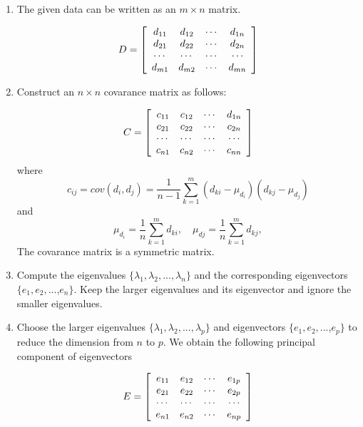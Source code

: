 \documentclass[12pt]{article}%
\begin{document}

\begin{enumerate}
\item The given data can be written as an $m\times n$ matrix.%

\[
D=\left[
\begin{array}
[c]{cccc}%
d_{11} & d_{12} & \cdots & d_{1n}\\
d_{21} & d_{22} & \cdots & d_{2n}\\
\cdots & \cdots & \cdots & \cdots\\
d_{m1} & d_{m2} & \cdots & d_{mn}%
\end{array}
\right]
\]


\item Construct an $n\times n$ covarance matrix as follows:%

\[
C=\left[
\begin{array}
[c]{cccc}%
c_{11} & c_{12} & \cdots & d_{1n}\\
c_{21} & c_{22} & \cdots & c_{2n}\\
\cdots & \cdots & \cdots & \cdots\\
c_{n1} & c_{n2} & \cdots & c_{nn}%
\end{array}
\right]
\]
where
\[
c_{ij}=cov(d_{i},d_{j})=\frac{1}{n-1}\sum_{k=1}^{m}(d_{ki}-\mu_{d_{i}}%
)(d_{kj}-\mu_{d_{j}})
\]
and
\[
\mu_{d_{i}}=\frac{1}{n}\sum_{k=1}^{m}d_{ki}, \quad\mu_{dj}=\frac{1}{n}%
\sum_{k=1}^{m}d_{kj},
\]
The covarance matrix is a symmetric matrix.

\item Compute the eigenvalues $\{\lambda_{1},\lambda_{2},...,\lambda_{n}\}$
and the corresponding eigenvectors $\{e_{1},e_{2},$...,$e_{n}\}.$ Keep the
larger eigenvalues and its eigenvector and ignore the smaller eigenvalues.

\item Choose the larger eigenvalues $\{\lambda_{1},\lambda_{2},...,\lambda
_{p}\}$ and eigenvectors $\{e_{1},e_{2},$...,$e_{p}\}$ to reduce the dimension
from $n$ to $p.$ We obtain the following principal component of eigenvectors%

\[
E=\left[
\begin{array}
[c]{cccc}%
e_{11} & e_{12} & \cdots & e_{1p}\\
e_{21} & e_{22} & \cdots & e_{2p}\\
\cdots & \cdots & \cdots & \cdots\\
e_{n1} & e_{n2} & \cdots & e_{np}%
\end{array}
\right]
\]



\end{enumerate}
\end{document}

